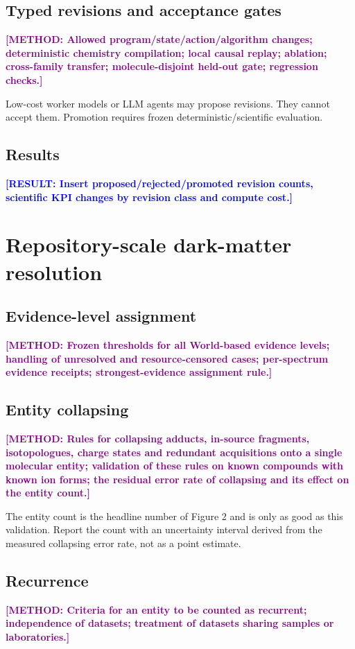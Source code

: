 \documentclass[12pt]{article}
\newcommand{\result}[1]{\textbf{\textcolor{blue}{[RESULT: #1]}}}
\newcommand{\methodtodo}[1]{\textbf{\textcolor{purple}{[METHOD: #1]}}}
\begin{document}
\subsection{Typed revisions and acceptance gates}
\methodtodo{Allowed program/state/action/algorithm changes; deterministic chemistry compilation; local causal replay; ablation; cross-family transfer; molecule-disjoint held-out gate; regression checks.}

Low-cost worker models or LLM agents may propose revisions. They cannot accept them. Promotion requires frozen deterministic/scientific evaluation.

\subsection{Results}
\result{Insert proposed/rejected/promoted revision counts, scientific KPI changes by revision class and compute cost.}

\section{Repository-scale dark-matter resolution}

\subsection{Evidence-level assignment}
\methodtodo{Frozen thresholds for all World-based evidence levels; handling of unresolved and resource-censored cases; per-spectrum evidence receipts; strongest-evidence assignment rule.}

\subsection{Entity collapsing}
\methodtodo{Rules for collapsing adducts, in-source fragments, isotopologues, charge states and redundant acquisitions onto a single molecular entity; validation of these rules on known compounds with known ion forms; the residual error rate of collapsing and its effect on the entity count.}

The entity count is the headline number of Figure 2 and is only as good as this validation. Report the count with an uncertainty interval derived from the measured collapsing error rate, not as a point estimate.

\subsection{Recurrence}
\methodtodo{Criteria for an entity to be counted as recurrent; independence of datasets; treatment of datasets sharing samples or laboratories.}
\end{document}
